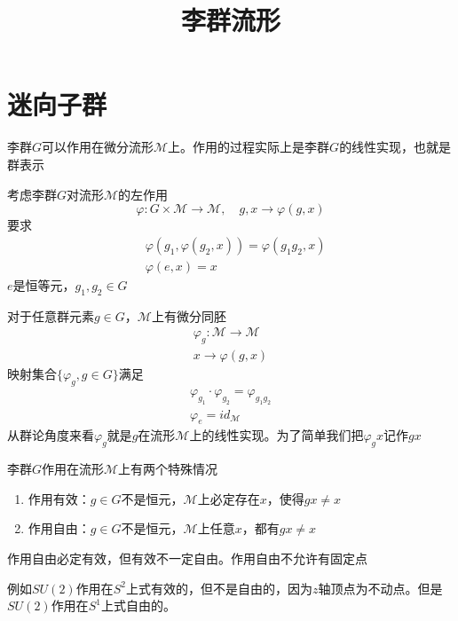 \documentclass{article}
\numberwithin{equation}{subsection}
\newcommand{\mM}{\mathcal{M}}
\begin{document}
\title{李群流形}
\maketitle
\section{迷向子群}
李群$G$可以作用在微分流形$\mM$上。作用的过程实际上是李群$G$的线性实现，也就是群表示

考虑李群$G$对流形$\mM$的左作用
\begin{equation}
    \varphi:G\times\mM\rightarrow \mM,\quad g,x\rightarrow\varphi(g,x)
\end{equation}
要求
\begin{equation}
    \begin{split}
        &\varphi(g_1,\varphi(g_2,x))=\varphi(g_1g_2,x)\\
        &\varphi(e,x)=x
    \end{split}
\end{equation}
$e$是恒等元，$g_1,g_2\in G$

对于任意群元素$g\in G$，$\mM$上有微分同胚
\begin{equation}
    \begin{split}
        \varphi_g:\mM\rightarrow\mM\\
        x\rightarrow\varphi(g,x)
    \end{split}
\end{equation}
映射集合$\{\varphi_g,g\in G\}$满足
\begin{equation}
    \begin{split}
        \varphi_{g_1}\cdot\varphi_{g_2}=\varphi_{g_1g_2}\\
        \varphi_e=id_{\mM}
    \end{split}
\end{equation}
从群论角度来看$\varphi_g$就是$g$在流形$\mM$上的线性实现。为了简单我们把$\varphi_gx$记作$gx$

李群$G$作用在流形$\mM$上有两个特殊情况
\begin{enumerate}
    \item 作用有效：$g\in G$不是恒元，$\mM$上必定存在$x$，使得$gx\neq x$
    \item 作用自由：$g\in G$不是恒元，$\mM$上任意$x$，都有$gx\neq x$
\end{enumerate}
作用自由必定有效，但有效不一定自由。作用自由不允许有固定点

例如$SU(2)$作用在$S^2$上式有效的，但不是自由的，因为$z$轴顶点为不动点。但是$SU(2)$作用在$S^1$上式自由的。
\end{document}
